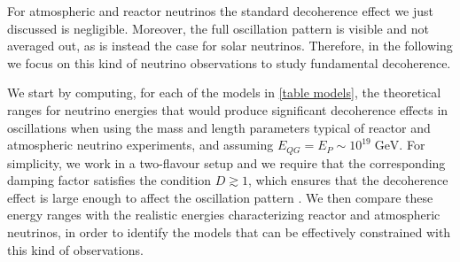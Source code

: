 \documentclass[11pt]{article}
\begin{document}
For atmospheric and reactor neutrinos the standard decoherence effect we just discussed is negligible. Moreover, the full oscillation pattern is visible and not averaged out, as is instead the case for solar neutrinos. Therefore, in the following we focus on this kind of neutrino observations to study fundamental decoherence. 

We start by computing, for each of the models in \cref{table models},  the theoretical ranges for neutrino energies that would produce significant decoherence effects in oscillations when using the mass and length parameters typical of reactor and atmospheric neutrino experiments, and assuming $E_{QG}=E_P\sim 10^{19}\;\text{GeV}$. For simplicity, we work in a two-flavour setup and we require that the corresponding damping factor satisfies the condition $D\gtrsim 1$, which ensures that the decoherence effect is large enough to affect the oscillation pattern \cite{Christian:2005qa}. We then compare these energy ranges with the realistic energies characterizing reactor and atmospheric neutrinos, in order to identify the models that can be effectively constrained with this kind of observations.



\end{document}
